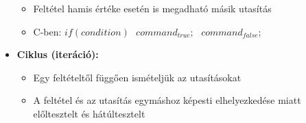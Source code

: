 \documentclass[11pt,a4paper]{article}
\begin{document}
\begin{tcolorbox}[colback=blue!5!white,colframe=blue!50!black,title= 15. Ismertesse az alapvető algoritmus-elemeket a Böhm-Jacopini tétel alapján!]
\begin{itemize}
\begin{itemize}
                        \item Feltétel hamis értéke esetén is megadható másik utasítás 
                        \item C-ben: \(if (condition)\hspace{8pt} command_{true} ;\hspace{8pt} command_{false};\)
                    \end{itemize}
                    \begin{center}
                    \end{center}
                    \item \textbf{Ciklus (iteráció):}
                    \begin{itemize}
                        \item Egy feltételtől függően ismételjük az utasításokat
                        \item A feltétel és az utasítás egymáshoz képesti elhelyezkedése miatt előltesztelt és hátúltesztelt
                    \end{itemize}
                \end{itemize}
                \begin{center}
                \end{center}
            \end{tcolorbox}
            
\end{document}
